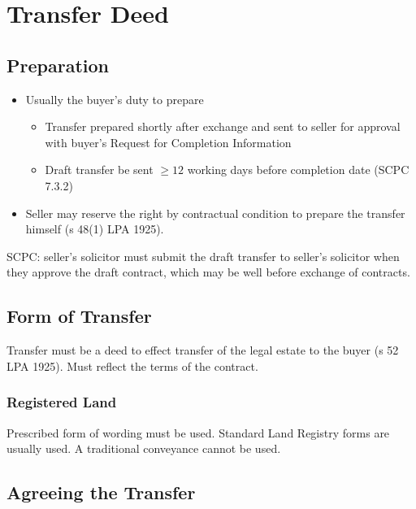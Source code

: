\documentclass[
]{article}
\providecommand{\tightlist}{%
  \setlength{\itemsep}{0pt}\setlength{\parskip}{0pt}}
\begin{document}
\hypertarget{transfer-deed}{%
\section{Transfer Deed}\label{transfer-deed}}

\hypertarget{preparation}{%
\subsection{Preparation}\label{preparation}}

\begin{itemize}
\tightlist
\item
  Usually the buyer's duty to prepare

  \begin{itemize}
  \tightlist
  \item
    Transfer prepared shortly after exchange and sent to seller for
    approval with buyer's Request for Completion Information
  \item
    Draft transfer be sent {\(\geq 12\)} working days before completion
    date (SCPC 7.3.2)
  \end{itemize}
\item
  Seller may reserve the right by contractual condition to prepare the
  transfer himself (s 48(1) LPA 1925).
\end{itemize}

SCPC: seller's solicitor must submit the draft transfer to seller's
solicitor when they approve the draft contract, which may be well before
exchange of contracts.

\hypertarget{form-of-transfer}{%
\subsection{Form of Transfer}\label{form-of-transfer}}

Transfer must be a deed to effect transfer of the legal estate to the
buyer (s 52 LPA 1925). Must reflect the terms of the contract.

\hypertarget{registered-land}{%
\subsubsection{Registered Land}\label{registered-land}}

Prescribed form of wording must be used. Standard Land Registry forms
are usually used. A traditional conveyance cannot be used.

\hypertarget{agreeing-the-transfer}{%
\subsection{Agreeing the Transfer}\label{agreeing-the-transfer}}
\end{document}
